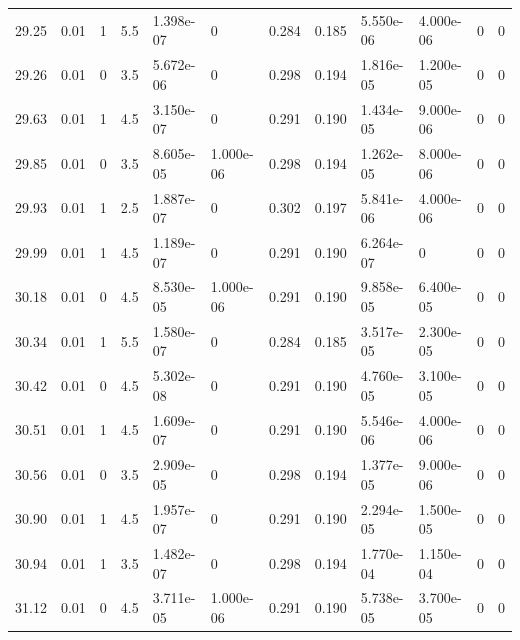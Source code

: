 \documentclass[preview]{standalone}
\begin{document}
{{{\begin{tabular}{L{1.2cm}C{1.2cm} C{0.3cm}C{0.5cm} C{1.4cm}C{1.4cm} C{1.4cm}C{1.4cm} C{1.6cm}C{1.6cm} C{1.6cm}C{1.6cm}}
  29.25  &  0.01  & 1     & 5.5 &  1.398e-07  & 0  &  0.284&   0.185& 5.550e-06 & 4.000e-06   &  0 & 0  \\ 
  29.26  &  0.01  & 0     & 3.5 &  5.672e-06  & 0  &  0.298&   0.194& 1.816e-05 & 1.200e-05   &  0 & 0  \\ 
  29.63  &  0.01  & 1     & 4.5 &  3.150e-07  & 0  &  0.291&   0.190& 1.434e-05 & 9.000e-06   &  0 & 0  \\ 
  29.85  &  0.01  & 0     & 3.5 &  8.605e-05  & 1.000e-06  &  0.298&   0.194& 1.262e-05 & 8.000e-06   &  0 & 0  \\ 
  29.93  &  0.01  & 1     & 2.5 &  1.887e-07  & 0  &  0.302&   0.197& 5.841e-06 & 4.000e-06   &  0 & 0  \\ 
  29.99  &  0.01  & 1     & 4.5 &  1.189e-07  & 0  &  0.291&   0.190& 6.264e-07 & 0   &  0 & 0  \\ 
  30.18  &  0.01  & 0     & 4.5 &  8.530e-05  & 1.000e-06  &  0.291&   0.190& 9.858e-05 & 6.400e-05   &  0 & 0  \\ 
  30.34  &  0.01  & 1     & 5.5 &  1.580e-07  & 0  &  0.284&   0.185& 3.517e-05 & 2.300e-05   &  0 & 0  \\ 
  30.42  &  0.01  & 0     & 4.5 &  5.302e-08  & 0  &  0.291&   0.190& 4.760e-05 & 3.100e-05   &  0 & 0  \\ 
  30.51  &  0.01  & 1     & 4.5 &  1.609e-07  & 0  &  0.291&   0.190& 5.546e-06 & 4.000e-06   &  0 & 0  \\ 
  30.56  &  0.01  & 0     & 3.5 &  2.909e-05  & 0  &  0.298&   0.194& 1.377e-05 & 9.000e-06   &  0 & 0  \\ 
  30.90  &  0.01  & 1     & 4.5 &  1.957e-07  & 0  &  0.291&   0.190& 2.294e-05 & 1.500e-05   &  0 & 0  \\ 
  30.94  &  0.01  & 1     & 3.5 &  1.482e-07  & 0  &  0.298&   0.194& 1.770e-04 & 1.150e-04   &  0 & 0  \\ 
  31.12  &  0.01  & 0     & 4.5 &  3.711e-05  & 1.000e-06  &  0.291&   0.190& 5.738e-05 & 3.700e-05   &  0 & 0  \\ 
\hline 
\end{tabular} 

}}}
\end{document}

